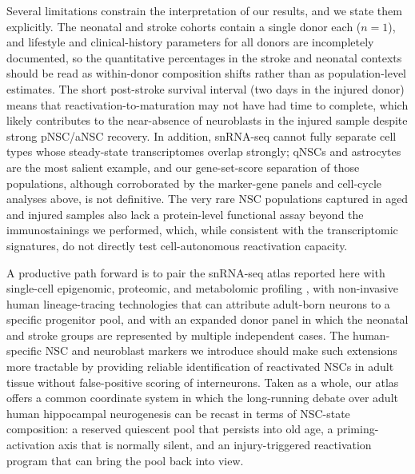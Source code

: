 \documentclass[11pt]{article}
\begin{document}
Several limitations constrain the interpretation of our results, and we
state them explicitly. The neonatal and stroke cohorts contain a single
donor each ($n=1$), and lifestyle and clinical-history parameters for all
donors are incompletely documented, so the quantitative percentages in the
stroke and neonatal contexts should be read as within-donor composition
shifts rather than as population-level estimates. The short post-stroke
survival interval (two days in the injured donor) means that
reactivation-to-maturation may not have had time to complete, which likely
contributes to the near-absence of neuroblasts in the injured sample
despite strong pNSC/aNSC recovery. In addition, snRNA-seq cannot fully
separate cell types whose steady-state transcriptomes overlap strongly;
qNSCs and astrocytes are the most salient example, and our gene-set-score
separation of those populations, although corroborated by the marker-gene
panels and cell-cycle analyses above, is not definitive. The very rare NSC
populations captured in aged and injured samples also lack a protein-level
functional assay beyond the immunostainings we performed, which, while
consistent with the transcriptomic signatures, do not directly test
cell-autonomous reactivation capacity.

A productive path forward is to pair the snRNA-seq atlas reported here with
single-cell epigenomic, proteomic, and metabolomic profiling
\cite{ayhan2021resolving,habib2017massively}, with non-invasive human
lineage-tracing technologies that can attribute adult-born neurons to a
specific progenitor pool, and with an expanded donor panel in which the
neonatal and stroke groups are represented by multiple independent cases.
The human-specific NSC and neuroblast markers we introduce should make
such extensions more tractable by providing reliable identification of
reactivated NSCs in adult tissue without false-positive scoring of
interneurons. Taken as a whole, our atlas offers a common coordinate
system in which the long-running debate over adult human hippocampal
neurogenesis can be recast in terms of NSC-state composition: a reserved
quiescent pool that persists into old age, a priming-activation axis that
is normally silent, and an injury-triggered reactivation program that can
bring the pool back into view.



\end{document}
